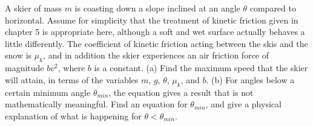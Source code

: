  A skier of mass $m$ is coasting down a slope inclined at
an angle $\theta $ compared to horizontal. Assume for
simplicity that the treatment of kinetic friction given in
chapter 5 is appropriate here, although a soft and wet
surface actually behaves a little differently. The
coefficient of kinetic friction acting between the skis and
the snow is $\mu_k$, and in addition the skier experiences
an air friction force of magnitude $bv^2$, where $b$ is a
constant.\hwendpart
 (a) Find the maximum speed that the skier will
attain, in terms of the variables $m$, $g$, $\theta$, $\mu_k$, and
$b$.\answercheck\hwendpart
 (b) For angles below a certain minimum angle $\theta_{min}$,
the equation gives a result that is not mathematically
meaningful. Find an equation for $\theta_{min}$, and give a
physical explanation of what is happening for $\theta <\theta_{min}$.\answercheck\hwendpart
